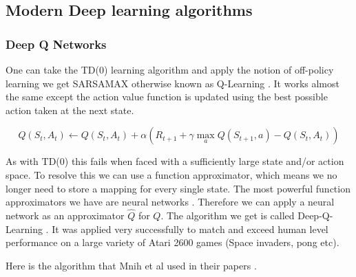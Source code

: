 \subsection{Modern Deep learning algorithms}\label{sec:MDLA}

\subsubsection{Deep Q Networks}
\label{subsec:DQN}

One can take the TD(0) learning algorithm and apply the notion of off-policy learning we get SARSAMAX otherwise known as Q-Learning \cite{watkinsLearningDelayedReward1989} \cite{watkinsQlearning1992} . It works almost the same except the action value function is updated using the best possible action taken at the next state.

\begin{equation}
Q(S_{t}, A_{t}) \leftarrow Q(S_{t}, A_{t}) + \alpha \left( R_{t+1}+\gamma \max_{a} Q(S_{t+1}, a) - Q(S_{t}, A_{t}) \right) 
\end{equation}

As with TD(0) this fails when faced with a sufficiently large state and/or action space. To resolve this we can use a function approximator, which means we no longer need to store a mapping for every single state. The most powerful function approximators we have are neural networks \cite{hornikMultilayerFeedforwardNetworks1989}. Therefore we can apply a neural network as an approximator $\hat{Q}$ for $Q$. The algorithm we get is called Deep-Q-Learning \cite{mnihPlayingAtariDeep2013}\cite{mnihHumanlevelControlDeep2015}. It was applied very successfully to match and exceed human level performance on a large variety of Atari 2600 games (Space invaders, pong etc).

Here is the algorithm that Mnih et al used in their papers \cite{mnihPlayingAtariDeep2013} \cite{mnihHumanlevelControlDeep2015}.

